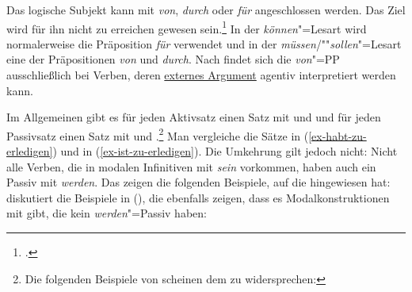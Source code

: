 \zl
Das logische Subjekt kann mit \emph{von}, \emph{durch} oder \emph{für} angeschlossen werden.
\ea
Das Ziel wird für ihn nicht zu erreichen gewesen sein.\footnote{
         .
}
\z
In der \emph{können}"=Lesart wird normalerweise die Präposition \emph{für} verwendet und in der
\emph{müssen}/""\emph{sollen}"=Lesart eine der Präpositionen \emph{von} und \emph{durch}.
%
%
Nach \citet[]{Demske94a} findet sich die \emph{von}"=PP ausschließlich bei Verben,
deren \hyperlink{externesArgument}{externes Argument}
agentiv interpretiert werden kann.

Im Allgemeinen gibt es für jeden Aktivsatz einen Satz mit \zuinf und \haben und für jeden
Passivsatz einen Satz mit \zuinf und \sein \citep*[]{Bierwisch63a}.\footnote{
Die folgenden Beispiele von \citet[]{Demske94a} scheinen dem zu widersprechen:
\eal
{}
\zllast
%
}
Man vergleiche die Sätze in (\ref{ex-habt-zu-erledigen}) und in (\ref{ex-ist-zu-erledigen}).
Die Umkehrung gilt jedoch nicht: Nicht alle Verben, die in modalen Infinitiven mit \emph{sein} vorkommen,
haben auch ein Passiv mit \emph{werden}. Das zeigen die folgenden
Beispiele, auf die \citet[]{Hoehle78a} hingewiesen hat:
\eal
{}
\zl
\citet[]{Haider86} diskutiert die Beispiele in (), die ebenfalls
zeigen, dass es Modalkonstruktionen mit \sein gibt, die kein \emph{werden}"=Passiv haben:
\eal
{}
\zl
